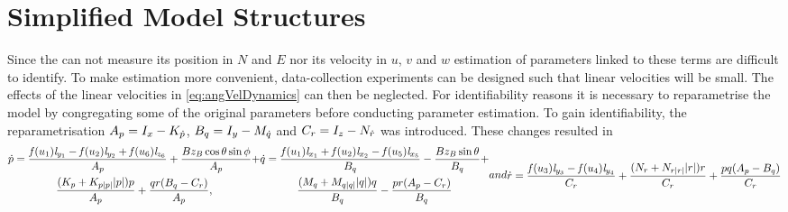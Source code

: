 \section{Simplified Model Structures} 
Since the \abbrROV can not measure its position in $N$ and $E$ nor its velocity in $u$, $v$ and $w$ estimation of parameters linked to these terms are difficult to identify. To make estimation more convenient, data-collection experiments can be designed such that linear velocities will be small. The effects of the linear velocities in \eqref{eq:angVelDynamics} can then be neglected. For identifiability reasons it is necessary to reparametrise the model by congregating some of the original parameters before conducting parameter estimation. To gain identifiability, the reparametrisation $A_p = I_{x} - K_{\dot{p}}$, $B_q = I_{y} - M_{\dot{q}}$ and $C_r = I_{z} - N_{\dot{r}}$ was introduced. These changes resulted in
\begin{subequations}\label{eq:quatModel}
\begin{multline} \label{eq:p_dotWithoutTranslation}
\pdot = \frac{\thrusterfun{1} \distance{y}{1} - \thrusterfun{2} \distance{y}{2} + \thrusterfun{6} \distance{z}{6}}{A_p} + \frac{B z_B \cos{\theta} \sin{\phi}}{A_p} + \\ \frac{(\Kp + \Kpabsp \abs{p})p}{A_p} + \frac{q r (B_q - C_r)}{A_p},
\end{multline}
\begin{multline} \label{eq:q_dotWithoutTranslation}
\qdot = \frac{\thrusterfun{1} \distance{x}{1} + \thrusterfun{2} \distance{x}{2} - \thrusterfun{5} \distance{x}{5}}{B_q} - \frac{B z_B \sin{\theta}}{B_q} + \\ \frac{(\Mq + \Mqabsq \abs{q})q}{B_q} - \frac{p r (A_p - C_r)}{B_q}
\end{multline}
and
\begin{multline} \label{eq:r_dotWithoutTranslation}
\rdot = \frac{\thrusterfun{3} \distance{y}{3} - \thrusterfun{4} \distance{y}{4}}{C_r} + \frac{(\Nr + \Nrabsr \abs{r})r}{C_r} + \frac{p q (A_p  - B_q)}{C_r}
\end{multline}
\end{subequations}


